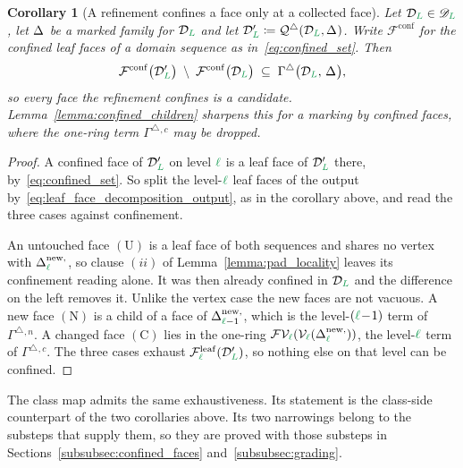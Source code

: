 \documentclass[a4paper, 12pt]{article}
\makeatletter
\newcommand{\quadriF}{\mathcal{Q}^{\triangle}}                   %
\newcommand{\collectF}{\Gamma^{\triangle}}                       %
\newcommand{\green}{\color{ForestGreen}}
\newcommand{\V}{\mathcal{V}}
\newcommand{\F}{\mathcal{F}}
\DeclareRobustCommand{\simplexsubsetTwo}[2][]{\Delta\ifx\@empty#1\@empty\else^{#1}\fi_{#2}}
\DeclareRobustCommand{\simplexsubsetNew}[2][]{\Delta^{\mathrm{new}\ifx\@empty#1\@empty\else,#1\fi}_{#2}}
\newcommand{\FVl}[1]{\F\V_{#1}}
\renewcommand{\l}{{\green\ell}}
\renewcommand{\L}{{\green L}}
\newtheorem{corollary}[theorem]{Corollary}
\theoremstyle{definition}
\theoremstyle{plain}
\numberwithin{equation}{section}
\DeclareRobustCommand{\domseq}[1][]{\mathcal{D}\ifx\@empty#1\@empty\else_{#1}\fi}
\newcommand{\alldomseqs}{\mathscr{D}}
\newcommand{\leafF}[1]{\F^{\mathrm{leaf}}_{#1}}             %
\makeatother
\begin{document}
\begin{corollary}[A refinement confines a face only at a collected face]
    \label{cor:new_confined_candidates}
    Let $\domseq[\L] \in \alldomseqs_\L$, let $\simplexsubsetTwo{}$ be a marked family for $\domseq[\L]$ and let $\domseq[\L]' \coloneq \quadriF(\domseq[\L], \simplexsubsetTwo{})$. Write $\F^{\mathrm{conf}}$ for the confined leaf faces of a domain sequence as in~\eqref{eq:confined_set}. Then
    \begin{equation}
        \label{eq:new_confined_candidates}
        \F^{\mathrm{conf}} \big( \domseq[\L]' \big) \; \setminus \; \F^{\mathrm{conf}} \big( \domseq[\L] \big) \; \subseteq \; \collectF \big( \domseq[\L], \, \simplexsubsetTwo{} \big) ,
    \end{equation}
    so every face the refinement confines is a candidate. Lemma~\ref{lemma:confined_children} sharpens this for a marking by confined faces, where the one-ring term $\collectF{}^{,c}$ may be dropped.
\end{corollary}
\begin{proof}
    A confined face of $\domseq[\L]'$ on level $\l$ is a leaf face of $\domseq[\L]'$ there, by~\eqref{eq:confined_set}. So split the level-$\l$ leaf faces of the output by~\eqref{eq:leaf_face_decomposition_output}, as in the corollary above, and read the three cases against confinement.

    An untouched face $(\mathrm{U})$ is a leaf face of both sequences and shares no vertex with $\simplexsubsetNew{\l}$, so clause $(ii)$ of Lemma~\ref{lemma:pad_locality} leaves its confinement reading alone. It was then already confined in $\domseq[\L]$ and the difference on the left removes it. Unlike the vertex case the new faces are not vacuous. A new face $(\mathrm{N})$ is a child of a face of $\simplexsubsetNew{\l-1}$, which is the level-$(\l \! - \! 1)$ term of $\collectF{}^{,n}$. A changed face $(\mathrm{C})$ lies in the one-ring $\FVl{\l}(\V_\l(\simplexsubsetNew{\l}))$, the level-$\l$ term of $\collectF{}^{,c}$. The three cases exhaust $\leafF{\l}(\domseq[\L]')$, so nothing else on that level can be confined.
\end{proof}

The class map admits the same exhaustiveness. Its statement is the class-side counterpart of the two corollaries above. Its two narrowings belong to the substeps that supply them, so they are proved with those substeps in Sections~\ref{subsubsec:confined_faces} and~\ref{subsubsec:grading}.
\end{document}
